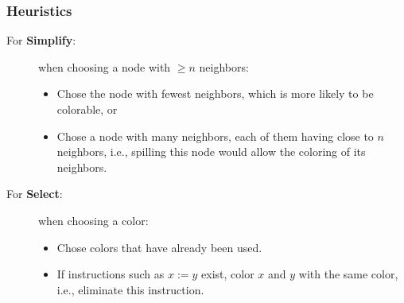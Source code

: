 \documentclass{beamer}
\begin{document}
\begin{frame}
\frametitle{Heuristics}

\begin{description}
\item[For {\bf Simplify}:] when choosing a node with $\geq n$ neighbors:\smallskip
\begin{itemize}

\item Chose the node with fewest neighbors, which is
        more likely to be colorable, or\smallskip

\item Chose a node with many neighbors, each of them
        having close to $n$ neighbors, i.e., spilling this node
        would allow the coloring of its neighbors.

\end{itemize}

\bigskip

\item[For {\bf Select}:] when choosing a color:\smallskip
\begin{itemize}

\item Chose colors that have already been used.\smallskip

\item If instructions such as  $x:=y$ exist, color $x$ and $y$
        with the same color, i.e., eliminate this instruction.

\end{itemize}

\end{description}

\end{frame}

\end{document}
